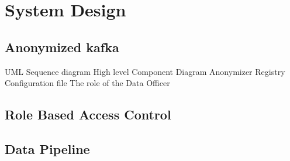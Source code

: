 \chapter{System Design\label{cha:chapter4}}

\section{Anonymized kafka}
UML Sequence diagram
High level Component Diagram
Anonymizer Registry
Configuration file 
The role of the Data Officer

\section{Role Based Access Control}

\section{Data Pipeline}